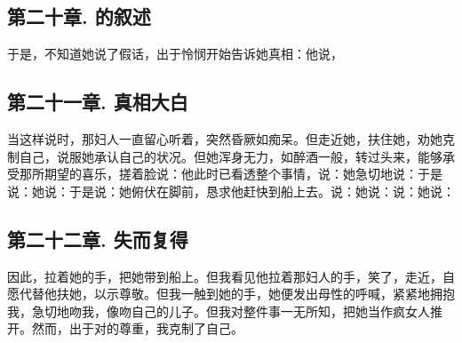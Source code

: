 
\subsection{第二十章. 的叙述}

于是，不知道她说了假话，出于怜悯开始告诉她真相：他说，\par


\subsection{第二十一章. 真相大白}

当这样说时，那妇人一直留心听着，突然昏厥如痴呆。但走近她，扶住她，劝她克制自己，说服她承认自己的状况。但她浑身无力，如醉酒一般，转过头来，能够承受那所期望的喜乐，搓着脸说：他此时已看透整个事情，说：她急切地说：于是说：她说：于是说：她俯伏在脚前，恳求他赶快到船上去。说：她说：说：她说：\par


\subsection{第二十二章. 失而复得}

因此，拉着她的手，把她带到船上。但我看见他拉着那妇人的手，笑了，走近，自愿代替他扶她，以示尊敬。但我一触到她的手，她便发出母性的呼喊，紧紧地拥抱我，急切地吻我，像吻自己的儿子。但我对整件事一无所知，把她当作疯女人推开。然而，出于对的尊重，我克制了自己。\par

